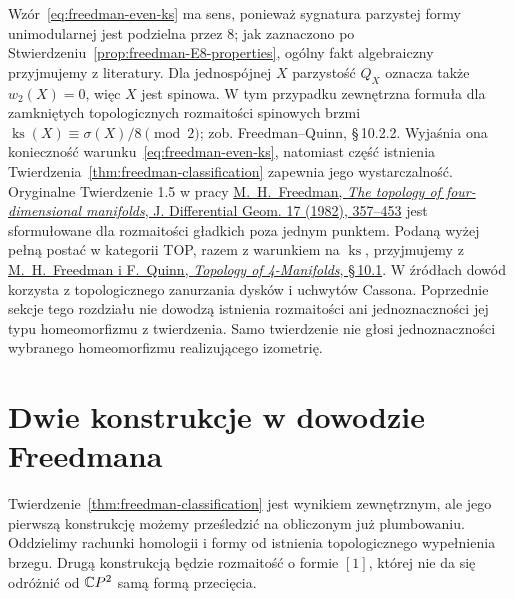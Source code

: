 Wzór~\eqref{eq:freedman-even-ks} ma sens, ponieważ
sygnatura parzystej formy unimodularnej jest podzielna
przez $8$; jak zaznaczono po
Stwierdzeniu~\ref{prop:freedman-E8-properties},
ogólny fakt algebraiczny przyjmujemy z literatury.
Dla jednospójnej $X$ parzystość $Q_X$ oznacza także
$w_2(X)=0$, więc $X$ jest spinowa. W tym przypadku
zewnętrzna formuła dla zamkniętych topologicznych
rozmaitości spinowych brzmi
$\operatorname{ks}(X)\equiv\sigma(X)/8\pmod2$;
zob. Freedman--Quinn, \S\,10.2.2. Wyjaśnia ona
konieczność warunku~\eqref{eq:freedman-even-ks},
natomiast część istnienia Twierdzenia~\ref{thm:freedman-classification}
zapewnia jego wystarczalność.
Oryginalne Twierdzenie 1.5 w pracy
\href{https://www.maths.gla.ac.uk/~mpowell/1982_The%20topology%20of%20four-dimensional%20manifolds.pdf}
{M.\ H.\ Freedman, \emph{The topology of four-dimensional
manifolds}, J. Differential Geom. 17 (1982), 357--453}
jest sformułowane dla rozmaitości gładkich poza jednym
punktem. Podaną wyżej pełną postać w kategorii TOP,
razem z warunkiem na $\operatorname{ks}$, przyjmujemy z
\href{https://archive.mpim-bonn.mpg.de/4789/2/FreedmanQuinn-TopologyOf4Manifolds-Reformatted2013.pdf}
{M.\ H.\ Freedman i F.\ Quinn, \emph{Topology of
4-Manifolds}, \S\,10.1}.
W źródłach dowód korzysta z topologicznego zanurzania
dysków i uchwytów Cassona. Poprzednie sekcje tego
rozdziału nie dowodzą istnienia rozmaitości ani
jednoznaczności jej typu homeomorfizmu z twierdzenia.
Samo twierdzenie nie głosi jednoznaczności wybranego
homeomorfizmu realizującego izometrię.

\section{Dwie konstrukcje w dowodzie Freedmana}
\label{sec:freedman-constructive-examples}

Twierdzenie~\ref{thm:freedman-classification} jest
wynikiem zewnętrznym, ale jego pierwszą konstrukcję
możemy prześledzić na obliczonym już plumbowaniu.
Oddzielimy rachunki homologii i formy od istnienia
topologicznego wypełnienia brzegu. Drugą konstrukcją
będzie rozmaitość o formie $[1]$, której nie da się
odróżnić od $\mathbb{C} P^2$ samą formą przecięcia.

